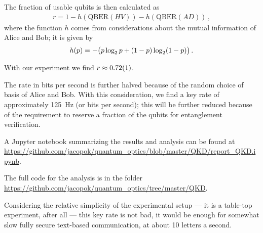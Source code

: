 \documentclass[main.tex]{subfiles}
\begin{document}
The fraction of usable qubits is then calculated as 
%
\begin{align}
r = 
1
- h (\text{QBER}(HV))
- h (\text{QBER}(AD))
\,,
\end{align}
%
where the function \(h\) comes from considerations about the mutual information of Alice and Bob; it is given by 
%
\begin{align}
h (p) = - \qty(p \log_2 p + (1-p) \log_2 (1-p) )
\,.
\end{align}

With our experiment we find \(r \approx \num{0.72+-0.01}\). 

The rate in bits per second is further halved because of the random choice of basis of Alice and Bob.
With this consideration, we find a key rate of approximately \SI{125}{Hz} (or bits per second); this will be further reduced because of the requirement to reserve a fraction of the qubits for entanglement verification.

A Jupyter notebook summarizing the results and analysis can be found at \url{https://github.com/jacopok/quantum_optics/blob/master/QKD/report_QKD.ipynb}.

The full code for the analysis is in the folder \url{https://github.com/jacopok/quantum_optics/tree/master/QKD}.

Considering the relative simplicity of the experimental setup --- it is a table-top experiment, after all --- this key rate is not bad, it would be enough for somewhat slow fully secure text-based communication, at about 10 letters a second. 
\end{document}

